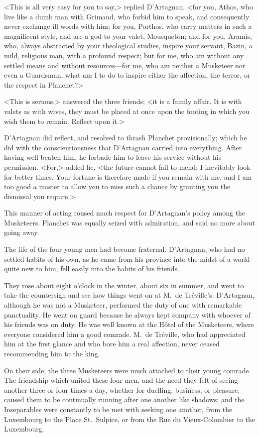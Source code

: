<This is all very easy for you to say,> replied D'Artagnan, <for you, Athos, who live like a dumb man with Grimaud, who forbid him to speak, and consequently never exchange ill words with him; for you, Porthos, who carry matters in such a magnificent style, and are a god to your valet, Mousqueton; and for you, Aramis, who, always abstracted by your theological studies, inspire your servant, Bazin, a mild, religious man, with a profound respect; but for me, who am without any settled means and without resources—for me, who am neither a Musketeer nor even a Guardsman, what am I to do to inspire either the affection, the terror, or the respect in Planchet?> 

<This is serious,> answered the three friends; <it is a family affair. It is with valets as with wives, they must be placed at once upon the footing in which you wish them to remain. Reflect upon it.> 

D'Artagnan did reflect, and resolved to thrash Planchet provisionally; which he did with the conscientiousness that D'Artagnan carried into everything. After having well beaten him, he forbade him to leave his service without his permission. <For,> added he, <the future cannot fail to mend; I inevitably look for better times. Your fortune is therefore made if you remain with me, and I am too good a master to allow you to miss such a chance by granting you the dismissal you require.> 

This manner of acting roused much respect for D'Artagnan's policy among the Musketeers. Planchet was equally seized with admiration, and said no more about going away. 

The life of the four young men had become fraternal. D'Artagnan, who had no settled habits of his own, as he came from his province into the midst of a world quite new to him, fell easily into the habits of his friends. 

They rose about eight o'clock in the winter, about six in summer, and went to take the countersign and see how things went on at M.~de Tréville's. D'Artagnan, although he was not a Musketeer, performed the duty of one with remarkable punctuality. He went on guard because he always kept company with whoever of his friends was on duty. He was well known at the Hôtel of the Musketeers, where everyone considered him a good comrade. M.~de Tréville, who had appreciated him at the first glance and who bore him a real affection, never ceased recommending him to the king. 

On their side, the three Musketeers were much attached to their young comrade. The friendship which united these four men, and the need they felt of seeing another three or four times a day, whether for duelling, business, or pleasure, caused them to be continually running after one another like shadows; and the Inseparables were constantly to be met with seeking one another, from the Luxembourg to the Place St.~Sulpice, or from the Rue du Vieux-Colombier to the Luxembourg. 

